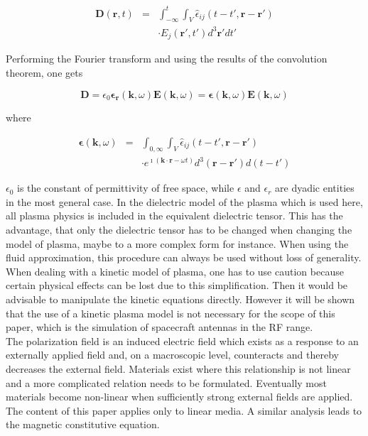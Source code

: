 \documentclass[two-column,ras]{agutex}
\begin{document}
\begin{article}
\begin{eqnarray}
    \mathbf{D}(\mathbf{r},t)&=&\int_{-\infty}^t\int_V\hat{\epsilon}_{ij}(t-t',\mathbf{r}-\mathbf{r'}) \\
&&\cdot E_j(\mathbf{r'},t')d^3\mathbf{r'}dt'\nonumber
\end{eqnarray}

Performing the Fourier transform and using the results of the convolution theorem, one gets

\begin{equation}
\mathbf{D} = \epsilon_0 \mathbf{\epsilon_r}(\mathbf{k},\omega) \mathbf{E}(\mathbf{k},\omega) = \mathbf{\epsilon}(\mathbf{k},\omega) \mathbf{E}(\mathbf{k},\omega)\label{constitutive_1_vacuum}
\end{equation}

where

\begin{eqnarray}
    \mathbf{\epsilon}(\mathbf{k},\omega)&=&\int_{0,\infty}\int_V\hat{\epsilon}_{ij}(t-t',\mathbf{r}-\mathbf{r'}) \\
&& \cdot e^{\imath (\mathbf{k}\cdot \mathbf{r}- \omega t)}d^3\mathbf{(r-r')}d(t-t') \nonumber
\end{eqnarray}

$\epsilon_0$ is the constant of permittivity of free space, while $\epsilon$ and $\epsilon_r$
are dyadic entities in the most general case. In the dielectric model of the plasma which is used here, all plasma physics is included in the equivalent dielectric tensor. This has the advantage, that only the dielectric tensor has to be changed when changing the model of plasma, maybe to a more complex form for instance. When using the fluid approximation, this procedure can always be used without loss of generality. When dealing with a kinetic model of plasma, one has to use caution because certain physical effects can be lost due to this simplification. Then it would be advisable to manipulate the kinetic equations directly. However it will be shown that the use of a kinetic plasma model is not necessary for the scope of this paper, which is the simulation of spacecraft antennas in the RF range.\\

The polarization field is an induced electric field which exists as a response to an externally applied field and, on a macroscopic level, counteracts and thereby decreases the external field. Materials exist where this relationship is not linear and a more complicated relation needs to be formulated. Eventually most materials become non-linear when
sufficiently strong external fields are applied. The content of this paper applies only to linear media. A similar analysis leads to the magnetic constitutive equation.\\




\end{article}
\end{document}
